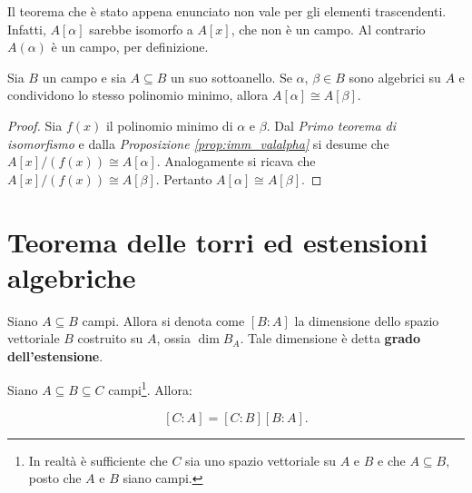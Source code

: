 \documentclass[11pt]{scrbook}
\begin{document}
\begin{remark*}
    Il teorema che è stato appena enunciato non vale per
    gli elementi trascendenti. Infatti, $A[\alpha]$ sarebbe
    isomorfo a $A[x]$, che non è un campo. Al contrario
    $A(\alpha)$ è un campo, per definizione.
\end{remark*}

\begin{proposition}
    Sia $B$ un campo e sia $A \subseteq B$ un suo sottoanello.
    Se $\alpha$, $\beta \in B$ sono algebrici su $A$ e condividono
    lo stesso polinomio minimo, allora $A[\alpha] \cong A[\beta]$.
\end{proposition}

\begin{proof}
    Sia $f(x)$ il polinomio minimo di $\alpha$ e $\beta$.
    Dal \textit{Primo teorema di isomorfismo} e dalla
    \textit{Proposizione \ref{prop:imm_valalpha}} si
    desume che $A[x]/(f(x)) \cong A[\alpha]$. Analogamente
    si ricava che $A[x]/(f(x)) \cong A[\beta]$. Pertanto
    $A[\alpha] \cong A[\beta]$.
\end{proof}

\section{Teorema delle torri ed estensioni algebriche}

\begin{definition}
    Siano $A \subseteq B$ campi. Allora si denota come
    $[B : A]$ la dimensione dello spazio vettoriale $B$
    costruito su $A$, ossia $\dim B_A$. Tale dimensione è detta \textbf{grado
        dell'estensione}.
\end{definition}

\begin{theorem}
    \label{th:torri}
    Siano $A \subseteq B \subseteq C$ campi\footnote{In realtà è sufficiente che $C$ sia uno spazio vettoriale su $A$ e $B$ e che $A \subseteq B$, posto che $A$ e $B$ siano campi.}. Allora:

    \[ [C : A] = [C : B] [B : A]. \]
    \vskip 0.1in
\end{theorem}
\end{document}
